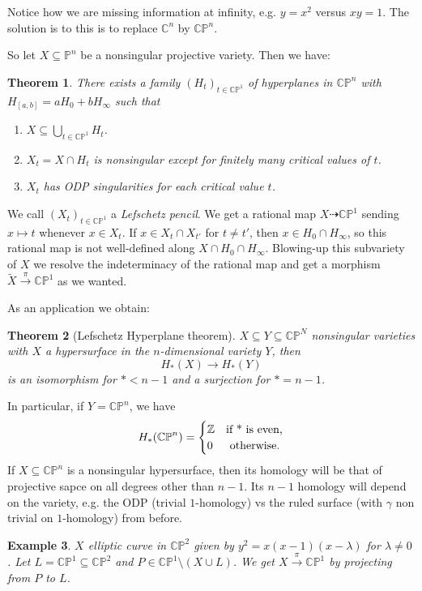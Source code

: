 \documentclass[12pt]{article}
\theoremstyle{darkgreentheorem}
\newtheorem{thm}{Theorem}
\theoremstyle{darkbluedefinition}
\theoremstyle{darkredexample}
\newtheorem{exa}[thm]{Example}
\theoremstyle{remark}
\newcommand{\Z}{\mathbb{Z}}
\newcommand{\1}{\mathbbm{1}}
\newcommand{\C}{\mathbb{C}}
\newcommand{\CP}{\mathbb{CP}}
\begin{document}
Notice how we are missing information at infinity, e.g. $y=x^{2}$ versus $xy=1$.
The solution is to this is to replace $\C^{n}$ by $\CP^{n}$.

So let $X\subseteq\mathbb{P}^{n}$ be a nonsingular projective variety.
Then we have:

\begin{thm}
    There exists a family $(H_{t})_{t\in \CP^{1}}$ of hyperplanes in $\CP^{n}$ with $H_{[a,b]}=aH_{0}+bH_{\infty}$ such that
    \begin{enumerate}
	\item $X\subseteq \bigcup_{t\in \CP^{1}}H_{t}$.
	\item $X_{t}=X\cap H_{t}$ is nonsingular except for finitely many critical values of $t$.
	\item $X_{t}$ has ODP singularities for each critical value $t$.
    \end{enumerate}
\end{thm}

We call $(X_{t})_{t\in \CP^{1}}$ a \textit{Lefschetz pencil}.
We get a rational map $X\dashrightarrow \CP^{1}$ sending $x\mapsto t$ whenever $x\in X_{t}$.
If $x\in X_{t}\cap X_{t'}$ for $t\neq t'$, then $x\in H_{0}\cap H_{\infty}$, so this rational map is not well-defined along $X\cap H_{0}\cap H_{\infty}$.
Blowing-up this subvariety of $X$ we resolve the indeterminacy of the rational map and get a morphism $\tilde{X}\xrightarrow{\pi} \CP^{1}$ as we wanted.

As an application we obtain:

\begin{thm}[Lefschetz Hyperplane theorem]
    $X\subseteq Y\subseteq \CP^{N}$ nonsingular varieties with $X$ a hypersurface in the $n$-dimensional variety $Y$, then
    \[ H_{*}(X)\to H_{*}(Y) \]
    is an isomorphism for $*<n-1$ and a surjection for $*=n-1$.
\end{thm}

In particular, if $Y=\CP^{n}$, we have
\[ H_{*}(\CP^{n})=\begin{cases} \Z & \text{if } $*$ \text{ is even,} \\ 0 & \text{ otherwise.} \end{cases}\]
If $X\subseteq \CP^{n}$ is a nonsingular hypersurface, then its homology will be that of projective sapce on all degrees other than $n-1$.
Its $n-1$ homology will depend on the variety, e.g. the ODP (trivial $1$-homology) vs the ruled surface (with $\gamma$ non trivial on $1$-homology) from before.

\begin{exa}
    $X$ elliptic curve in $\CP^{2}$ given by $y^{2}=x(x-1)(x-\lambda)$ for $\lambda\neq 0$.
    Let $L=\CP^{1}\subseteq \CP^{2}$ and $P\in \CP^{1}\setminus (X\cup L)$.
    We get $X\xrightarrow{\pi}\CP^{1}$ by projecting from $P$ to $L$.
\end{exa}
\end{document}
